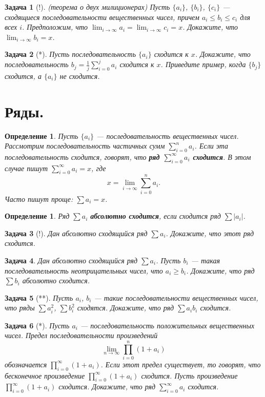 \documentclass[12pt]{book}
\newcommand{\subs}{\section}
\theoremstyle{upshape}
\newtheorem{zadacha}{Задача}[chapter]
\theoremstyle{generic}
\newtheorem{opredelenie}[teorema]{Определение}
\theoremstyle{upshapenonumber}
\newcommand{\следствие}{%
     \refstepcounter{teorema}
     {\noindent\bf Следствие \thechapter.\arabic{teorema}:\ }}
\newcommand{\пример}{%
     \refstepcounter{teorema}
     {\noindent\bf Пример \thechapter.\arabic{teorema}:\ }}
\newcommand{\лемма}{%
     \refstepcounter{teorema}
     {\noindent\bf Лемма \thechapter.\arabic{teorema}:\ }}
\newcommand{\теорема}{%
     \refstepcounter{teorema}
     {\noindent\bf Теорема \thechapter.\arabic{teorema}:\ }}
\newcommand{\утверждение}{%
     \refstepcounter{teorema}
     {\noindent\bf Утверждение \thechapter.\arabic{teorema}:\ }}
\begin{document}
\begin{zadacha}[!] 
(теорема о двух милиционерах) Пусть $\{ a_i\}$, $\{b_i\}$,
$\{c_i\}$ --- сходящиеся последовательности вещественных чисел,
причем $a_i \leq b_i \leq c_i$ для всех $i$.  Предположим, что
$\lim_{i \to \infty} a_i = \lim_{i \to \infty} c_i =x$.  Докажите,
что $\lim_{i \to \infty} b_i =x$.
\end{zadacha}

\begin{zadacha}[*] Пусть последовательность $\{a_i\}$ сходится
к $x$. Докажите, что последовательность $b_j = \frac 1 j
\sum_{i=0}^j a_i$ сходится к $x$. Приведите пример, когда $\{b_j\}$
сходится, а $\{a_i\}$ не сходится.
\end{zadacha}

\subs{Ряды.}

\begin{opredelenie} Пусть $\{a_i\}$ --- последовательность
вещественных чисел. Рассмотрим последовательность частичных сумм
$\sum_{i=0}^n a_i$.  Если эта последовательность сходится, говорят,
что {\bf ряд $\sum_{i=0}^\infty a_i$ сходится}. В этом случае пишут
$\sum_{i=0}^\infty a_i =x$, где
$$ 
   x = \lim_{i \to \infty} \sum_{i=0}^n a_i.
$$
Часто пишут проще: $\sum a_i =x$.
\end{opredelenie}

\begin{opredelenie} Ряд $\sum a_i$ {\bf абсолютно сходится},
если сходится ряд $\sum |a_i|$.
\end{opredelenie}

\begin{zadacha}[!] Дан абсолютно сходящийся ряд
$\sum a_i$. Докажите, что этот ряд сходится.
\end{zadacha}

\begin{zadacha} Дан абсолютно сходящийся ряд $\sum a_i$. Пусть 
$b_i$ --- такая последовательность неотрицательных чисел, что $a_i
\geq b_i$. Докажите, что ряд $\sum b_i$ абсолютно сходится.
\end{zadacha}

\begin{zadacha}[**] Пусть $a_i$, $b_i$ --- такие последовательности
вещественных чисел, что ряды $\sum a_i^2$, $\sum b_i^2$
сходятся. Докажите, что ряд $\sum a_ib_i$ сходится.
\end{zadacha}

\begin{zadacha}[*] Пусть $a_i$ --- последовательность
положительных вещественных чисел. Предел последовательности
произведений
$$
\lim_{n\to \infty} \prod^n_{i=0} (1+a_i)
$$
обозначается $\prod^\infty_{i=0} (1+a_i)$. Если этот предел
существует, то говорят, что бесконечное произведение
$\prod^\infty_{i=0} (1+a_i)$ сходится. Пусть произведение
$\prod^\infty_{i=0} (1+a_i)$ сходится. Докажите, что ряд
$\sum^\infty_{i=0} a_i$ сходится.
\end{zadacha}
\end{document}
